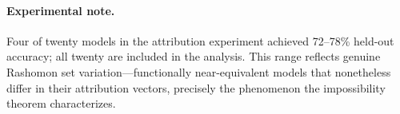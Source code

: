 \paragraph{Experimental note.}
Four of twenty models in the attribution experiment achieved 72--78\% held-out
accuracy; all twenty are included in the analysis. This range reflects genuine Rashomon
set variation---functionally near-equivalent models that nonetheless differ in their
attribution vectors, precisely the phenomenon the impossibility theorem characterizes.
